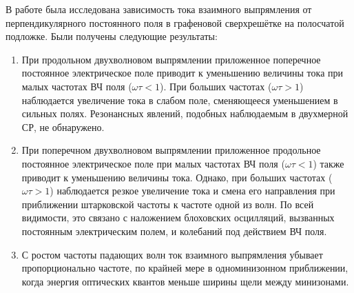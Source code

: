 В работе была исследована зависимость тока взаимного выпрямления от перпендикулярного постоянного поля в графеновой сверхрешётке на полосчатой подложке. Были получены следующие результаты:
\begin{enumerate}
    \item При продольном двухволновом выпрямлении приложенное поперечное постоянное электрическое поле приводит к уменьшению величины тока при малых частотах ВЧ поля (\(\omega\tau < 1\)). При  больших частотах (\(\omega\tau > 1\)) наблюдается увеличение тока в слабом поле, сменяющееся уменьшением в сильных полях. Резонансных явлений, подобных наблюдаемым в двухмерной СР, не обнаружено.
    \item При поперечном двухволновом выпрямлении приложенное продольное постоянное электрическое поле при малых частотах ВЧ поля (\(\omega\tau < 1\)) также приводит к уменьшению величины тока. Однако, при больших частотах (\(\omega\tau > 1\)) наблюдается резкое увеличение тока и смена его направления при приближении штарковской частоты к частоте одной из волн. По всей видимости, это связано с наложением блоховских осцилляций, вызванных постоянным электрическим полем, и колебаний под действием ВЧ поля.
    \item С ростом частоты падающих волн ток взаимного выпрямления убывает пропорционально частоте, по крайней мере в одноминизонном приближении, когда энергия оптических квантов меньше ширины щели между минизонами.
\end{enumerate}